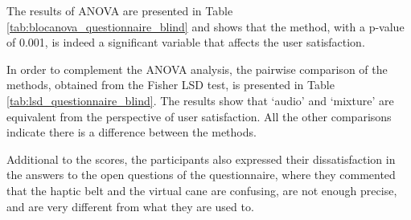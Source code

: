 The results of ANOVA are presented in Table  \ref{tab:blocanova_questionnaire_blind} and shows that the method, with a p-value of 0.001, is indeed a significant variable that affects the user satisfaction.



In order to complement the ANOVA analysis, the pairwise comparison of the methods, obtained from the Fisher LSD test, is presented in Table \ref{tab:lsd_questionnaire_blind}. The results show that ‘audio’ and ‘mixture’ are equivalent from the perspective of user satisfaction. All the other comparisons indicate there is a difference between the methods.



Additional to the scores, the participants also expressed their dissatisfaction in the answers to the open questions of the questionnaire, where they commented that the haptic belt and the virtual cane are confusing, are not enough precise, and are very different from what they are used to.

\FloatBarrier